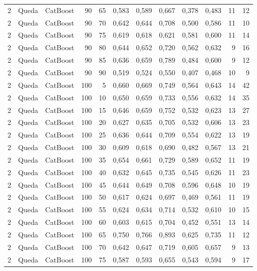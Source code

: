 \begin{longtable}{@{}rllrrrrrrrrr@{}}
2 & Queda & CatBoost & 90 & 65 & 0,583 & 0,589 & 0,667 & 0,378 & 0,483 & 11 & 12 \\
2 & Queda & CatBoost & 90 & 70 & 0,642 & 0,644 & 0,708 & 0,500 & 0,586 & 11 & 10 \\
2 & Queda & CatBoost & 90 & 75 & 0,619 & 0,618 & 0,621 & 0,581 & 0,600 & 11 & 14 \\
2 & Queda & CatBoost & 90 & 80 & 0,644 & 0,652 & 0,720 & 0,562 & 0,632 & 9 & 16 \\
2 & Queda & CatBoost & 90 & 85 & 0,636 & 0,659 & 0,789 & 0,484 & 0,600 & 9 & 12 \\
2 & Queda & CatBoost & 90 & 90 & 0,519 & 0,524 & 0,550 & 0,407 & 0,468 & 10 & 9 \\
2 & Queda & CatBoost & 100 & 5 & 0,660 & 0,669 & 0,749 & 0,564 & 0,643 & 14 & 42 \\
2 & Queda & CatBoost & 100 & 10 & 0,650 & 0,659 & 0,733 & 0,556 & 0,632 & 14 & 35 \\
2 & Queda & CatBoost & 100 & 15 & 0,646 & 0,659 & 0,752 & 0,532 & 0,623 & 13 & 27 \\
2 & Queda & CatBoost & 100 & 20 & 0,627 & 0,635 & 0,705 & 0,532 & 0,606 & 13 & 23 \\
2 & Queda & CatBoost & 100 & 25 & 0,636 & 0,644 & 0,709 & 0,554 & 0,622 & 13 & 19 \\
2 & Queda & CatBoost & 100 & 30 & 0,609 & 0,618 & 0,690 & 0,482 & 0,567 & 13 & 21 \\
2 & Queda & CatBoost & 100 & 35 & 0,654 & 0,661 & 0,729 & 0,589 & 0,652 & 11 & 19 \\
2 & Queda & CatBoost & 100 & 40 & 0,632 & 0,645 & 0,735 & 0,545 & 0,626 & 11 & 23 \\
2 & Queda & CatBoost & 100 & 45 & 0,644 & 0,649 & 0,708 & 0,596 & 0,648 & 10 & 19 \\
2 & Queda & CatBoost & 100 & 50 & 0,617 & 0,624 & 0,697 & 0,469 & 0,561 & 11 & 19 \\
2 & Queda & CatBoost & 100 & 55 & 0,624 & 0,634 & 0,714 & 0,532 & 0,610 & 10 & 15 \\
2 & Queda & CatBoost & 100 & 60 & 0,603 & 0,615 & 0,704 & 0,452 & 0,551 & 13 & 14 \\
2 & Queda & CatBoost & 100 & 65 & 0,750 & 0,766 & 0,893 & 0,625 & 0,735 & 11 & 12 \\
2 & Queda & CatBoost & 100 & 70 & 0,642 & 0,647 & 0,719 & 0,605 & 0,657 & 9 & 13 \\
2 & Queda & CatBoost & 100 & 75 & 0,587 & 0,593 & 0,655 & 0,543 & 0,594 & 9 & 17 \\

\end{longtable}
